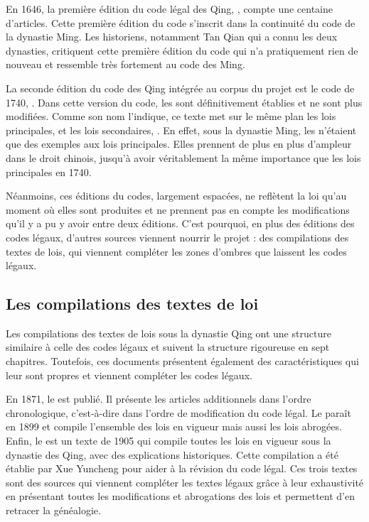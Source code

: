 En 1646, la première édition du code légal des Qing, \dqlj, compte une centaine d'articles. Cette première édition du code s'inscrit dans la continuité du code de la dynastie Ming. Les historiens, notamment Tan Qian  qui a connu les deux dynasties, critiquent cette première édition du code qui n'a pratiquement rien de nouveau et ressemble très fortement au code des Ming. 

La seconde édition du code des Qing intégrée au corpus du projet est le code de 1740, \dq. Dans cette version du code, les \lu sont définitivement établies et ne sont plus modifiées. Comme son nom l'indique, ce texte met sur le même plan les lois principales, \lu et les lois secondaires, \li. En effet, sous la dynastie Ming, les \li n'étaient que des exemples aux lois principales. Elles prennent de plus en plus d'ampleur dans le droit chinois, jusqu'à avoir véritablement la même importance que les lois principales en 1740.

Néanmoins, ces éditions du codes, largement espacées, ne reflètent la loi qu'au moment où elles sont produites et ne prennent pas en compte les modifications qu'il y a pu y avoir entre deux éditions. C'est pourquoi, en plus des éditions des codes légaux, d'autres sources viennent nourrir le projet \COREL : des compilations des textes de lois, qui viennent compléter les zones d'ombres que laissent les codes légaux.

\subsection{Les compilations des textes de loi}

Les compilations des textes de lois sous la dynastie Qing ont une structure similaire à celle des codes légaux et suivent la structure rigoureuse en sept chapitres. Toutefois, ces documents présentent également des caractéristiques qui leur sont propres et viennent compléter les codes légaux. 

En 1871, le \genyuan est publié. Il présente les articles additionnels dans l'ordre chronologique, c'est-à-dire dans l'ordre de modification du code légal. Le \huidian paraît en 1899 et compile l'ensemble des lois en vigueur mais aussi les lois abrogées. Enfin, le \dc est un texte de 1905 qui compile toutes les lois en vigueur sous la dynastie des Qing, avec des explications historiques. Cette compilation a été établie par Xue Yuncheng pour aider à la révision du code légal. Ces trois textes sont des sources qui viennent compléter les textes légaux grâce à leur exhaustivité en présentant toutes les modifications et abrogations des lois et permettent d'en retracer la généalogie.

